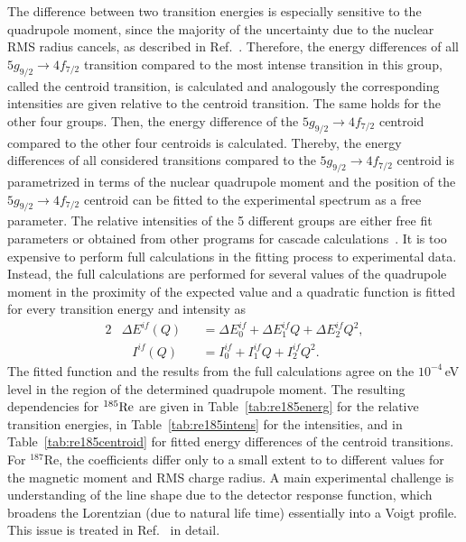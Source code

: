 The difference between two transition energies is especially sensitive to the quadrupole moment, since the majority of the uncertainty due to the nuclear RMS radius cancels, as described in Ref.~\cite{konijn1979}. Therefore, the energy differences of all $5g_{9/2}\rightarrow4f_{7/2}$ transition compared to the most intense transition in this group, called the centroid transition, is calculated and analogously the corresponding intensities are given relative to the centroid transition.
The same holds for the other four groups. Then, the energy difference of the $5g_{9/2}\rightarrow4f_{7/2}$ centroid compared to the other four centroids is calculated.
Thereby, the energy differences of all considered transitions compared to the $5g_{9/2}\rightarrow4f_{7/2}$ centroid is parametrized in terms of the nuclear quadrupole moment and the position of the $5g_{9/2}\rightarrow4f_{7/2}$ centroid can be fitted to the experimental spectrum as a free parameter. The relative intensities of the 5 different groups are either free fit parameters or obtained from other programs for cascade calculations~\cite{elisa_privcomm}.
It is too expensive to perform full calculations in the fitting process to experimental data. Instead, the full calculations are performed for several values of the quadrupole moment in the proximity of the expected value and a quadratic function is fitted for every transition energy and intensity as
\begin{alignat}{2}
&\Delta E^{if}(Q)&&= \Delta E^{if}_0 +  \Delta E^{if}_1 Q+  \Delta E^{if}_2 Q^2,\label{eq:en_fit}\\
&\phantom{\Delta}I^{if}(Q)&&= I^{if}_0 +  I^{if}_1 Q+  I^{if}_2 Q^2.\label{eq:tran_fit}
\end{alignat}
The fitted function and the results from the full calculations agree on the $10^{-4}\,$eV level in the region of the determined quadrupole moment. The resulting dependencies for $^{185}\rm{Re}$ are given in Table~\ref{tab:re185energ} for the relative transition energies, in Table~\ref{tab:re185intens} for the intensities, and in Table~\ref{tab:re185centroid} for fitted energy differences of the centroid transitions. For $^{187}$Re, the coefficients differ only to a small extent to to different values for the magnetic moment and RMS charge radius.
A main experimental challenge is understanding of the line shape due to the detector response function, which broadens the Lorentzian (due to natural life time) essentially into a Voigt profile. This issue is treated in Ref.~\cite{vogiatzi2018} in detail.

